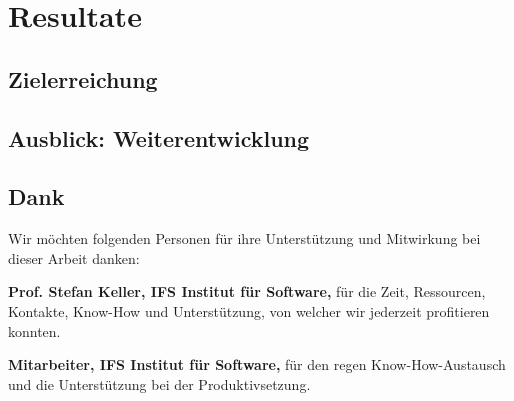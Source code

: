
\section{Resultate}
\label{Resultate}


\subsection{Zielerreichung}
\label{Resultate:Zielerreichung}


\subsection{Ausblick: Weiterentwicklung}
\label{Resultate:Ausblick: Weiterentwicklung}




\subsection{Dank}
\label{Resultate:Dank}

Wir möchten folgenden Personen für ihre Unterstützung und Mitwirkung bei dieser Arbeit danken:

\textbf{Prof. Stefan Keller, IFS Institut für Software,} für die Zeit, Ressourcen, Kontakte, Know-How und Unterstützung, von welcher wir jederzeit profitieren konnten.

\textbf{Mitarbeiter, IFS Institut für Software,} für den regen Know-How-Austausch und die Unterstützung bei der Produktivsetzung.
